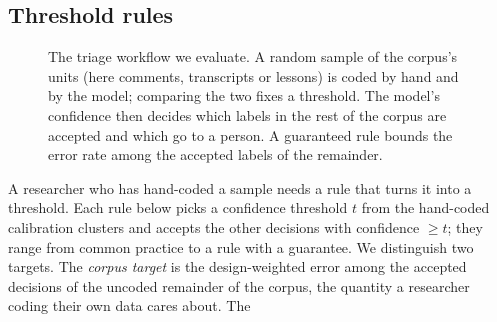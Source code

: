 \subsection{Threshold rules}
\label{sec:rules}
\begin{figure}[tb]
  \centering
  \caption{The triage workflow we evaluate. A random sample of the corpus's units (here comments, transcripts or lessons) is
  coded by hand and by the model; comparing the two fixes a threshold. The model's confidence then decides which labels in the
  rest of the corpus are accepted and which go to a person. A guaranteed rule bounds the error rate among the accepted labels
  of the remainder.}
  \label{fig:workflow}
\end{figure}
A researcher who has hand-coded a sample needs a rule that turns it into a threshold. Each rule below picks a confidence
threshold $t$ from the hand-coded calibration clusters and accepts the other decisions with confidence $\ge t$; they range
from common practice to a rule with a guarantee. We distinguish two targets. The \emph{corpus target} is the design-weighted error among the accepted
decisions of the uncoded remainder of the corpus, the quantity a researcher coding their own data cares about. The
